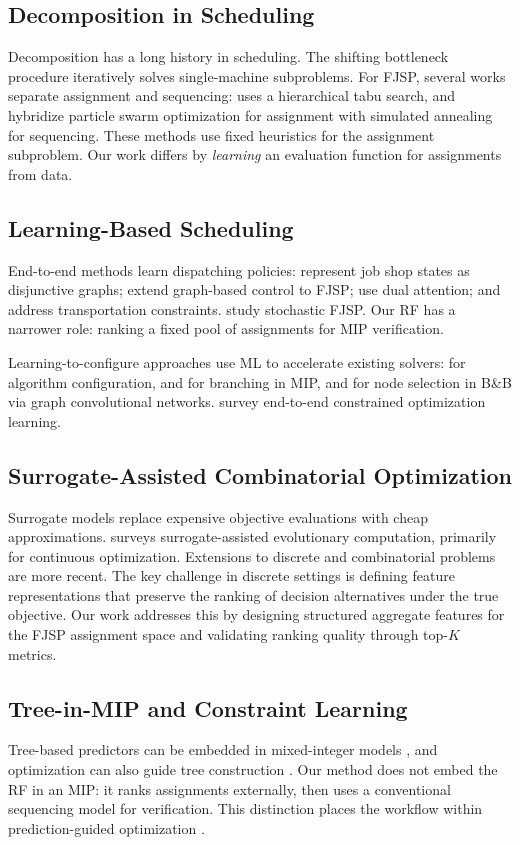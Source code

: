 \documentclass[conference]{IEEEtran}
\begin{document}
\subsection{Decomposition in Scheduling}
Decomposition has a long history in scheduling. The shifting bottleneck procedure \cite{Adams1988} iteratively solves single-machine subproblems. For FJSP, several works separate assignment and sequencing: \cite{Brandimarte1993} uses a hierarchical tabu search, and \cite{Xia2005} hybridize particle swarm optimization for assignment with simulated annealing for sequencing. These methods use fixed heuristics for the assignment subproblem. Our work differs by \emph{learning} an evaluation function for assignments from data.

\subsection{Learning-Based Scheduling}
End-to-end methods learn dispatching policies: \cite{Zhang2020drl} represent job shop states as disjunctive graphs; \cite{Song2023} extend graph-based control to FJSP; \cite{Wang2024} use dual attention; and \cite{Moon2024learning} address transportation constraints. \cite{Smit2024nco} study stochastic FJSP. Our RF has a narrower role: ranking a fixed pool of assignments for MIP verification.

Learning-to-configure approaches use ML to accelerate existing solvers: \cite{Hutter2011} for algorithm configuration, \cite{He2014} and \cite{Khalil2016} for branching in MIP, and \cite{Gasse2019} for node selection in B\&B via graph convolutional networks. \cite{Kotary2021} survey end-to-end constrained optimization learning.

\subsection{Surrogate-Assisted Combinatorial Optimization}
Surrogate models replace expensive objective evaluations with cheap approximations. \cite{Jin2011} surveys surrogate-assisted evolutionary computation, primarily for continuous optimization. Extensions to discrete and combinatorial problems are more recent. The key challenge in discrete settings is defining feature representations that preserve the ranking of decision alternatives under the true objective. Our work addresses this by designing structured aggregate features for the FJSP assignment space and validating ranking quality through top-$K$ metrics.

\subsection{Tree-in-MIP and Constraint Learning}
Tree-based predictors can be embedded in mixed-integer models \cite{Verwer2017,Maragno2023}, and optimization can also guide tree construction \cite{Bertsimas2017}. Our method does not embed the RF in an MIP: it ranks assignments externally, then uses a conventional sequencing model for verification. This distinction places the workflow within prediction-guided optimization \cite{Elmachtoub2022}.
\end{document}
